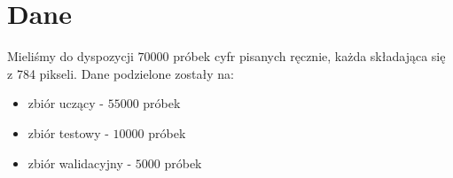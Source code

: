 \chapter{Dane}
Mieliśmy do dyspozycji $70000$ próbek cyfr pisanych ręcznie, każda składająca się z 784 pikseli. Dane podzielone zostały na:
\begin{itemize}
\item zbiór uczący - $55000$ próbek
\item zbiór testowy - $10000$ próbek
\item zbiór walidacyjny - $5000$ próbek
\end{itemize}
